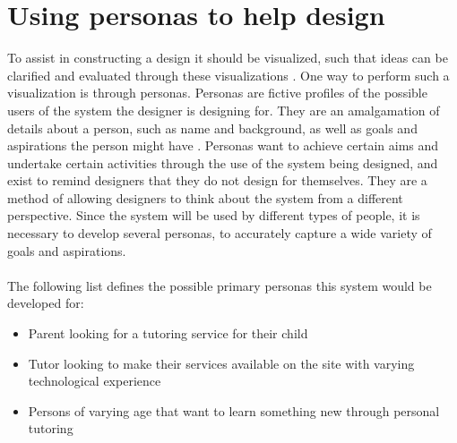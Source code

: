 \section{Using personas to help design}
To assist in constructing a design it should be visualized, such that ideas can be clarified and evaluated through these visualizations \cite{DEB}.
One way to perform such a visualization is through personas.
Personas are fictive profiles of the possible users of the system the designer is designing for.
They are an amalgamation of details about a person, such as name and background, as well as goals and aspirations the person might have \cite{DEB}.
Personas want to achieve certain aims and undertake certain activities through the use of the system being designed, and exist to remind designers that they do not design for themselves.
They are a method of allowing designers to think about the system from a different perspective.
Since the system will be used by different types of people, it is necessary to develop several personas, to accurately capture a wide variety of goals and aspirations.
\\\\
The following list defines the possible primary personas this system would be developed for:
\begin{itemize}
    \item Parent looking for a tutoring service for their child
    \item Tutor looking to make their services available on the site with varying technological experience
    \item Persons of varying age that want to learn something new through personal tutoring
\end{itemize}

